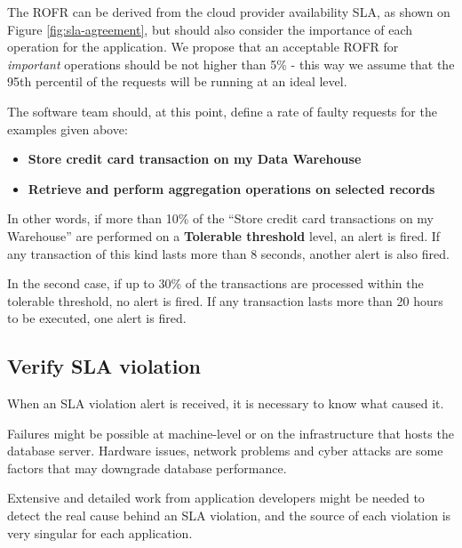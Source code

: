 The ROFR can be derived from the cloud provider availability SLA, as shown on Figure \ref{fig:sla-agreement}, but should also consider the importance of each operation for the application. We propose that an acceptable ROFR for \textit{important} operations should be not higher than 5\% - this way we assume that the 95th percentil of the requests will be running at an ideal level. 

The software team should, at this point, define a rate of faulty requests for the examples given above: 

\begin{itemize}
\item{ 
\textbf{Store credit card transaction on my Data Warehouse}
}

\item{
\textbf{Retrieve and perform aggregation operations on selected records}
}
\end{itemize}

In other words, if more than 10\% of the ``Store credit card transactions on my Warehouse'' are performed on a \textbf{Tolerable threshold} level, an alert is fired. If any transaction of this kind lasts more than 8 seconds, another alert is also fired. 

In the second case, if up to 30\% of the transactions are processed within the tolerable threshold, no alert is fired. If any transaction lasts more than 20 hours to be executed, one alert is fired.


\subsection {Verify SLA violation}

When an SLA violation alert is received, it is necessary to know what caused it.

Failures might be possible at machine-level or on the infrastructure that hosts the database server. Hardware issues, network problems and cyber attacks are some factors that may downgrade database performance.  

Extensive and detailed work from application developers might be needed to detect the real cause behind an SLA violation, and the source of each violation is very singular for each application.

